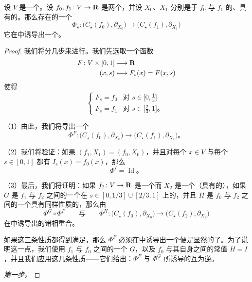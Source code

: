\begin{theorem}\label{thm:chain-morphism-isomorphism}
设 $V$ 是一个\trCompact\trManifold。设 $f_0,f_1\colon V\to\mathbf{R}$ 是两个\trMorseFunction，并设 $X_0$、$X_1$ 分别是\trAdapted{}于 $f_0$ 与 $f_1$ 的、具有\trSmaleCondition{}的\trPseudogradient。那么存在\trComplex{}的一个\trMorphism
\[
\Phi_{\star}\colon\bigl(C_{\star}(f_0),\partial_{X_0}\bigr)
  \longrightarrow\bigl(C_{\star}(f_1),\partial_{X_1}\bigr)
\]
它在\trHomology{}中诱导出一个\trIsomorphism。
\end{theorem}

\begin{proof}
我们将分几步来进行。我们先选取一个函数
\[
\begin{aligned}
F\colon V\times[0,1] &\longrightarrow \mathbf{R}\\
(x,s) &\longmapsto F_s(x)=F(x,s)
\end{aligned}
\]
使得
\[
\begin{cases}
F_s=f_0 & \text{对 } s\in\bigl[0,\tfrac{1}{3}\bigr]\\
F_s=f_1 & \text{对 } s\in\bigl[\tfrac{2}{3},1\bigr]\text{。}
\end{cases}
\]

（1）由此，我们将导出一个\trMorphism
\[
\Phi^F\colon\bigl(C_{\star}(f_0),\partial_{X_0}\bigr)
  \longrightarrow\bigl(C_{\star}(f_1),\partial_{X_1}\bigr)\text{。}
\]

（2）我们将验证：如果 $(f_1,X_1)=(f_0,X_0)$，并且对每个 $x\in V$ 与每个 $s\in[0,1]$ 都有 $I_s(x)=f_0(x)$，那么
\[
\Phi^I=\operatorname{Id}\text{。}
\]

（3）最后，我们将证明：如果 $f_2\colon V\to\mathbf{R}$ 是一个\trMorseFunction{}而 $X_2$ 是一个（具有\trSmaleCondition{}的）\trAdapted{}\trGradient，如果 $G$ 是 $f_1$ 与 $f_2$ 之间的一个在 $s\in[0,1/3]\cup[2/3,1]$ 上\trStationary{}的\trInterpolation，并且 $H$ 是 $f_0$ 与 $f_2$ 之间的一个具有同样性质的\trInterpolation，那么由
\[
\Phi^G\circ\Phi^F \qquad\text{与}\qquad
\Phi^H\colon\bigl(C_{\star}(f_0),\partial_{X_0}\bigr)
  \longrightarrow\bigl(C_{\star}(f_2),\partial_{X_2}\bigr)
\]
在\trHomology{}中诱导出的诸\trMorphism{}相重合。

如果这三条性质都得到满足，那么 $\Phi^F$ 必须在\trHomology{}中诱导出一个\trIsomorphism{}便是显然的了。为了说明这一点，我们使用 $f_1$ 与 $f_0$ 之间的一个\trInterpolation{} $G$，以及 $f_0$ 与其自身之间的常值\trInterpolation{} $H=I$，并且我们应用这几条性质——它们给出：$\Phi^F$ 与 $\Phi^G$ 所诱导的\trIsomorphism{}互为逆。

\emph{第一步。}


\end{proof}
